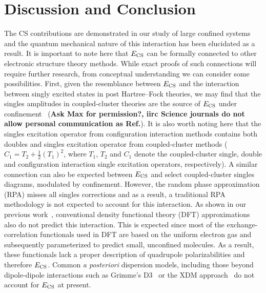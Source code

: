 \documentclass[aps,prl,groupaddress, twocolumn]{revtex4-1}  %
\begin{document}
\section*{Discussion and Conclusion}
The CS contributions are demonstrated in our study of large confined systems and the quantum mechanical nature of this interaction has been elucidated as a result. It is important to note here that $E_{\rm CS}$ can be formally connected to other electronic structure theory methods. While exact proofs of such connections will require further research, from conceptual understanding we can consider some possibilities. First, given the resemblance between $E_{\rm CS}$ and the interaction between singly excited states in post Hartree--Fock theories, we may find that the singles amplitudes in coupled-cluster theories are the source of $E_{\rm CS}$ under confinement~\cite{connect_CC} (\textbf{Ask Max for permission?, iirc Science journals do not allow personal communication as Ref.}). It is also worth noting here that the singles excitation operator from configuration interaction methods contains both doubles and singles excitation operator from coupled-cluster methods ($C_1 = T_2 + \frac{1}{2}{(T_1)}^2$, where $T_1$, $T_2$ and $C_1$ denote the coupled-cluster single, double and configuration interaction single excitation operators, respectively). A similar connection can also be expected between $E_{\rm CS}$ and select coupled-cluster singles diagrams, modulated by confinement. However, the random phase approximation (RPA) misses all singles corrections and as a result, a traditional RPA methodology is not expected to account for this interaction. As shown in our previous work~\cite{sadhukhan_prl_2017}, conventional density functional theory (DFT) approximations also do not predict this interaction. This is expected since most of the exchange-correlation functionals used in DFT are  based on the uniform electron gas and subsequently parameterized to predict small, unconfined molecules. As a result, these functionals lack a proper description of quadrupole polarizabilities and therefore  $E_{\rm CS}$. Common \textit{a posteriori} dispersion models, including those beyond dipole-dipole interactions such as Grimme's D3~\cite{grimme_2010} or the XDM approach~\cite{becke_2006,angyan_2007,ayers_2009,heselmann_2009} do not account for $E_{\rm CS}$ at present.
\end{document}

